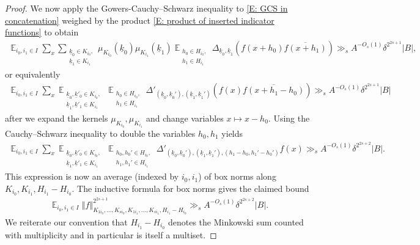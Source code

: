\documentclass[11pt]{amsart}
\theoremstyle{definition}
\DeclareMathOperator*{\E}{\mathbb{E}}
\newcommand{\uk}{{\underline{k}}}
\newcommand{\norm}[1]{\left\Vert #1\right\Vert}
\begin{document}
\begin{proof}
    
    We now apply the Gowers-Cauchy--Schwarz inequality to \eqref{E: GCS in concatenation} weighed by the product \eqref{E: product of inserted indicator functions} to obtain
    \begin{align*}
        \E_{i_0, i_1\in I} \sum_x  \sum_{\substack{\uk_0\in K_{i_0},\\ \uk_1\in K_{i_1}}} \mu_{K_{i_0}}(\uk_0) \mu_{K_{i_1}}(\uk_1) \E_{\substack{h_0\in H_{i_0},\\ h_1\in H_{i_1}}} \Delta_{\uk_0, \uk_1}(f(x+h_0)\overline{f(x+h_1)})\gg_{s} A^{-O_s(1)} \delta^{2^{2s+1}}|B|,
    \end{align*}
    or equivalently
    \begin{align*}
        \E_{i_0, i_1\in I} \sum_x  \E_{\substack{\uk_0, \uk'_0 \in K_{i_0},\\ \uk_1, \uk'_1 \in K_{i_1}}} \E_{\substack{h_0\in H_{i_0},\\ h_1\in H_{i_1}}} \Delta'_{(\uk_0,\uk_0'), (\uk_1, \uk_1')}(f(x)\overline{f(x+h_1-h_0)})\gg_{s} A^{-O_s(1)} \delta^{2^{2s+1}}|B|
    \end{align*}
    after we expand the kernels $\mu_{K_{i_0}}, \mu_{K_{i_1}}$ and change variables $x\mapsto x - h_0$. Using the Cauchy--Schwarz inequality to double the variables $h_0, h_1$ yields
    \begin{align*}
        \E_{i_0, i_1\in I} \sum_x  \E_{\substack{\uk_0, \uk'_0 \in K_{i_0},\\ \uk_1, \uk'_1 \in K_{i_1}}} \E_{\substack{h_0, h_0'\in H_{i_0},\\ h_1, h_1' \in H_{i_1}}} \Delta'_{(\uk_0,\uk_0'), (\uk_1, \uk_1'), (h_1-h_0, h_1'-h_0')}f(x)\gg_{s} A^{-O_s(1)} \delta^{2^{2s+2}}|B|.
    \end{align*}
    This expression is now an average (indexed by $i_0, i_1$) of box norms along $K_{i_0}, K_{i_1}, H_{i_1}-H_{i_0}$.  The inductive formula for box norms gives the claimed bound
    \begin{align*}
        \E_{i_0, i_1\in I}\norm{f}_{K_{1 i_0}, \ldots, K_{s i_0}, K_{1 i_1}, \ldots, K_{s i_1}, H_{i_1}-H_{i_0}}^{2^{2s+1}}\gg_{s} A^{-O_s(1)} \delta^{2^{2s+2}} |B|.
    \end{align*}
    We reiterate our convention that $H_{i_1}-H_{i_0}$ denotes the Minkowski sum counted with multiplicity and in particular is itself a multiset.
\end{proof}
\end{document}
